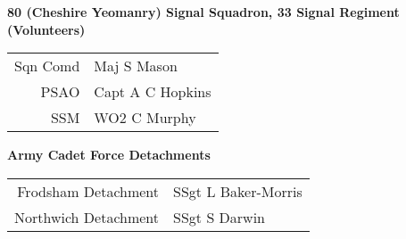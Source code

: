 \vspace*{10mm}

\begin{center}
  \Large
  \textbf{80 (Cheshire Yeomanry) Signal Squadron, 33 Signal Regiment (Volunteers)}
\end{center}

\begin{center}
  \begin{tabular}{rl}
    Sqn Comd & Maj S Mason \\
    PSAO & Capt A C Hopkins \\
    SSM & WO2 C Murphy \\
  \end{tabular}
\end{center}

\vspace*{5mm}

\begin{center}
  \Large
  \textbf{Army Cadet Force Detachments}
\end{center}

\begin{center}
  \begin{tabular}{rl}
    Frodsham Detachment & SSgt L Baker-Morris \\
    Northwich Detachment & SSgt S Darwin \\
  \end{tabular}
\end{center}

